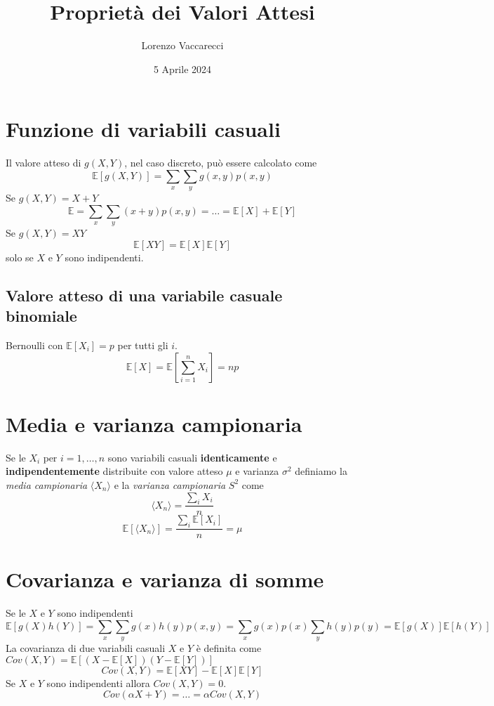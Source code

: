 \documentclass[12pt]{article}
\title{Proprietà dei Valori Attesi}
\author{Lorenzo Vaccarecci}
\date{5 Aprile 2024}
\begin{document}
\maketitle
\section{Funzione di variabili casuali}
Il valore atteso di $g(X,Y)$, nel caso discreto, può essere calcolato come
\begin{equation*}
    \mathbb{E}[g(X,Y)]=\sum_{x}\sum_{y} g(x,y)p(x,y)
\end{equation*}
Se $g(X,Y)=X+Y$
\begin{equation*}
    \mathbb{E} = \sum_{x}\sum_{y} (x+y)p(x,y) = \ldots = \mathbb{E}[X]+\mathbb{E}[Y]
\end{equation*}
Se $g(X,Y)=XY$
\begin{equation*}
    \mathbb{E}[XY]=\mathbb{E}[X]\mathbb{E}[Y]
\end{equation*}
solo se $X$ e $Y$ sono indipendenti.
\subsection{Valore atteso di una variabile casuale binomiale}
Bernoulli con $\mathbb{E}[X_{i}]=p$ per tutti gli $i$.
\begin{equation*}
    \mathbb{E}[X]=\mathbb{E}\left[\sum_{i=1}^{n}X_{i}\right]=np
\end{equation*}
\section{Media e varianza campionaria}
Se le $X_{i} \text{ per } i = 1,\ldots,n$ sono variabili casuali \textbf{identicamente} e \textbf{indipendentemente} distribuite con valore atteso $\mu$ e varianza $\sigma^{2}$ definiamo la \textit{media campionaria} $\langle X_{n}\rangle$ e la \textit{varianza campionaria} $S^{2}$ come
\begin{equation*}
    \langle X_{n} \rangle = \frac{\sum_{i}X_{i}}{n}
\end{equation*}
\begin{equation*}
    \mathbb{E}[\langle X_{n} \rangle] = \frac{\sum_{i}\mathbb{E}[X_{i}]}{n} = \mu
\end{equation*}
\section{Covarianza e varianza di somme}
Se le $X$ e $Y$ sono indipendenti
\begin{equation*}
    \mathbb{E}[g(X)h(Y)]=\sum_{x}\sum_{y}g(x)h(y)p(x,y)=\sum_{x}g(x)p(x)\sum_{y}h(y)p(y)=\mathbb{E}[g(X)]\mathbb{E}[h(Y)]
\end{equation*}
La covarianza di due variabili casuali $X$ e $Y$ è definita come $Cov(X,Y)=\mathbb{E}[(X-\mathbb{E}[X])(Y-\mathbb{E}[Y])]$
\begin{equation*}
    Cov(X,Y)=\mathbb{E}[XY]-\mathbb{E}[X]\mathbb{E}[Y]
\end{equation*}
Se $X$ e $Y$ sono indipendenti allora $Cov(X,Y)=0$.
\begin{equation*}
    Cov(\alpha X+Y)= \ldots = \alpha Cov(X,Y)
\end{equation*}
\end{document}
